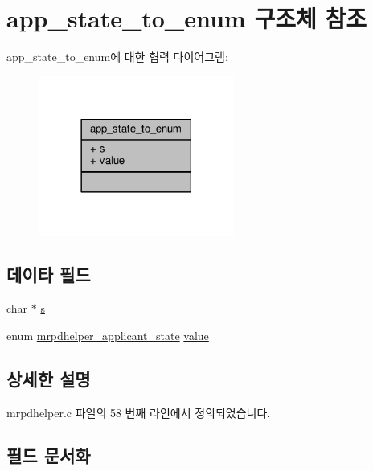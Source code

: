 \hypertarget{structapp__state__to__enum}{}\section{app\+\_\+state\+\_\+to\+\_\+enum 구조체 참조}
\label{structapp__state__to__enum}


app\+\_\+state\+\_\+to\+\_\+enum에 대한 협력 다이어그램\+:
\nopagebreak
\begin{figure}[H]
\begin{center}
\leavevmode
\includegraphics[width=182pt]{structapp__state__to__enum__coll__graph}
\end{center}
\end{figure}
\subsection*{데이타 필드}
\begin{DoxyCompactItemize}
\item 
char $\ast$ \hyperlink{structapp__state__to__enum_ab51cd24d34f6509eafb5e059f4c7d10e}{s}
\item 
enum \hyperlink{mrpdhelper_8h_aa30602e7d8b3a7e3abf38950d4357baa}{mrpdhelper\+\_\+applicant\+\_\+state} \hyperlink{structapp__state__to__enum_a3f2cd28210b71e61a01e29b0686f63d4}{value}
\end{DoxyCompactItemize}


\subsection{상세한 설명}


mrpdhelper.\+c 파일의 58 번째 라인에서 정의되었습니다.



\subsection{필드 문서화}
